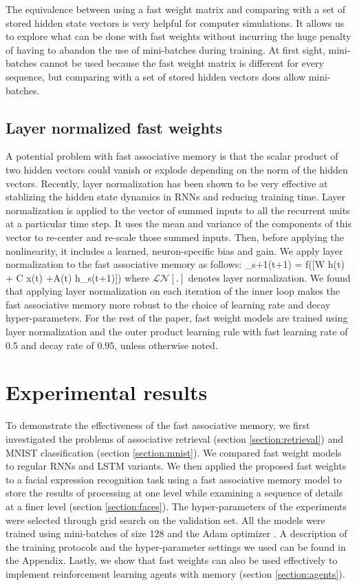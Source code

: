 \documentclass{article}
\def\bea#1\eea{\begin{align}#1\end{align}}
\begin{document}
The equivalence between using a fast weight matrix and comparing with a set of stored hidden state vectors is very helpful for computer simulations.  It allows us to explore what can be done with fast weights without incurring the huge penalty of having to abandon the use of mini-batches during training. At first sight, mini-batches cannot be used because the fast weight matrix is different for every sequence, but comparing with a set of stored hidden vectors does allow mini-batches. 

\subsection{Layer normalized fast weights}
A potential problem with fast associative memory is that the scalar product of two hidden vectors could vanish or explode depending on the norm of the hidden vectors.  Recently, layer normalization \citep{ln} has been shown to be very effective at stablizing the hidden state dynamics in RNNs and reducing training time.  Layer normalization is applied to the vector of summed inputs to all the recurrent units at a particular time step. It uses the mean and variance of the components of this vector to re-center and re-scale  those summed inputs. Then,  before applying the nonlinearity,  it includes a learned, neuron-specific bias and gain.  We apply layer normalization to the fast associative memory as follows: 
\bea h_{s+1}(t+1) = f([W h(t) + C x(t) +A(t) h_s(t+1)]) \eea 
where $\mathcal{LN}[.]$ denotes layer normalization. We found that applying layer normalization on each iteration of the inner loop makes the fast associative memory more robust to the choice of learning rate and decay hyper-parameters. For the rest of the paper, fast weight models are trained using layer normalization and the outer product learning rule with fast learning rate of 0.5 and decay rate of 0.95, unless otherwise noted.

\section{Experimental results}
To demonstrate the effectiveness of the fast associative memory, we first investigated the problems of associative retrieval (section \ref{section:retrieval}) and MNIST classification (section \ref{section:mnist}). We compared fast weight models to regular RNNs and LSTM variants. We then applied the proposed fast weights to a facial expression recognition task using a  fast associative memory model to store the results of processing at one level while examining a sequence of details at a finer level (section \ref{section:faces}). The hyper-parameters of the experiments were selected through grid search on the validation set. All the models were trained using mini-batches of size 128 and the Adam optimizer \citep{adam}. A description of the training protocols and the hyper-parameter settings we used can be found in the Appendix. Lastly, we show that fast weights can also be used effectively to implement reinforcement learning agents with memory (section \ref{section:agents}). 
\end{document}
